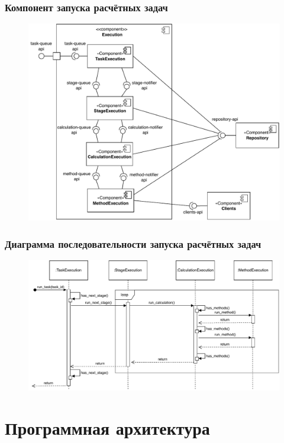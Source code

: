 \begin{frame}
\frametitle{Компонент запуска расчётных задач}
\begin{figure}
    \includegraphics[scale=.5]{pictures/architecture/orchestrator_component_detailed}
\end{figure}
\end{frame}


\begin{frame}
\frametitle{Диаграмма последовательности запуска расчётных задач}
\begin{figure}
    \includegraphics[scale=.7]{pictures/architecture/orchestrator_sequence}
\end{figure}
\end{frame}


\section{Программная архитектура}

